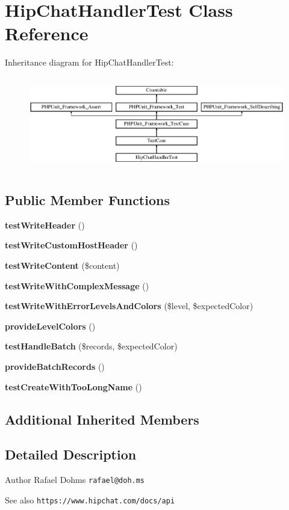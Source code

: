 \section{Hip\+Chat\+Handler\+Test Class Reference}
\label{class_monolog_1_1_handler_1_1_hip_chat_handler_test}
Inheritance diagram for Hip\+Chat\+Handler\+Test\+:\begin{figure}[H]
\begin{center}
\leavevmode
\includegraphics[height=4.129793cm]{class_monolog_1_1_handler_1_1_hip_chat_handler_test}
\end{center}
\end{figure}
\subsection*{Public Member Functions}
\begin{DoxyCompactItemize}
\item 
{\bf test\+Write\+Header} ()
\item 
{\bf test\+Write\+Custom\+Host\+Header} ()
\item 
{\bf test\+Write\+Content} (\$content)
\item 
{\bf test\+Write\+With\+Complex\+Message} ()
\item 
{\bf test\+Write\+With\+Error\+Levels\+And\+Colors} (\$level, \$expected\+Color)
\item 
{\bf provide\+Level\+Colors} ()
\item 
{\bf test\+Handle\+Batch} (\$records, \$expected\+Color)
\item 
{\bf provide\+Batch\+Records} ()
\item 
{\bf test\+Create\+With\+Too\+Long\+Name} ()
\end{DoxyCompactItemize}
\subsection*{Additional Inherited Members}


\subsection{Detailed Description}
\begin{DoxyAuthor}{Author}
Rafael Dohms {\tt rafael@doh.\+ms} 
\end{DoxyAuthor}
\begin{DoxySeeAlso}{See also}
{\tt https\+://www.\+hipchat.\+com/docs/api} 
\end{DoxySeeAlso}


